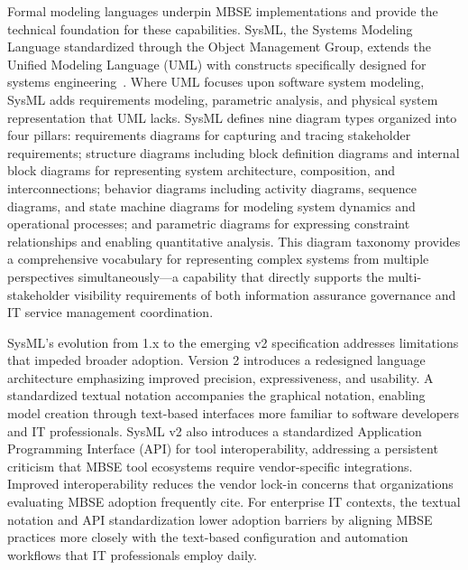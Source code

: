 Formal modeling languages underpin MBSE implementations and provide the technical foundation for these capabilities. SysML, the Systems Modeling Language standardized through the Object Management Group, extends the Unified Modeling Language (UML) with constructs specifically designed for systems engineering~\parencite{Friedenthal_Moore_Steiner_2014}. Where UML focuses upon software system modeling, SysML adds requirements modeling, parametric analysis, and physical system representation that UML lacks. SysML defines nine diagram types organized into four pillars: requirements diagrams for capturing and tracing stakeholder requirements; structure diagrams including block definition diagrams and internal block diagrams for representing system architecture, composition, and interconnections; behavior diagrams including activity diagrams, sequence diagrams, and state machine diagrams for modeling system dynamics and operational processes; and parametric diagrams for expressing constraint relationships and enabling quantitative analysis. This diagram taxonomy provides a comprehensive vocabulary for representing complex systems from multiple perspectives simultaneously---a capability that directly supports the multi-stakeholder visibility requirements of both information assurance governance and IT service management coordination.

SysML's evolution from 1.x to the emerging v2 specification addresses limitations that impeded broader adoption. Version 2 introduces a redesigned language architecture emphasizing improved precision, expressiveness, and usability. A standardized textual notation accompanies the graphical notation, enabling model creation through text-based interfaces more familiar to software developers and IT professionals. SysML v2 also introduces a standardized Application Programming Interface (API) for tool interoperability, addressing a persistent criticism that MBSE tool ecosystems require vendor-specific integrations. Improved interoperability reduces the vendor lock-in concerns that organizations evaluating MBSE adoption frequently cite. For enterprise IT contexts, the textual notation and API standardization lower adoption barriers by aligning MBSE practices more closely with the text-based configuration and automation workflows that IT professionals employ daily.

